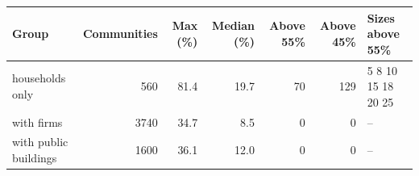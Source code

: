 \begin{tabular}{lrrrrrl}
\toprule
Group & Communities & Max (\%) & Median (\%) & Above 55\% & Above 45\% & Sizes above 55\% \\
\midrule
households only & 560 & 81.4 & 19.7 & 70 & 129 & 5 8 10 15 18 20 25 \\
with firms & 3740 & 34.7 & 8.5 & 0 & 0 & -- \\
with public buildings & 1600 & 36.1 & 12.0 & 0 & 0 & -- \\
\bottomrule
\end{tabular}
